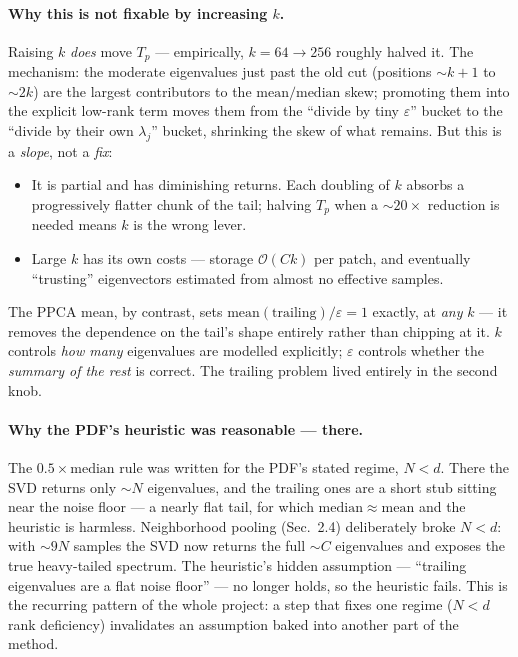 \documentclass[11pt]{article}
\begin{document}
\paragraph{Why this is not fixable by increasing $k$.}
Raising $k$ \emph{does} move $T_p$ --- empirically, $k = 64 \to 256$ roughly
halved it. The mechanism: the moderate eigenvalues just past the old cut
(positions ${\sim}k\!+\!1$ to ${\sim}2k$) are the largest contributors to the
$\mathrm{mean}/\mathrm{median}$ skew; promoting them into the explicit
low-rank term moves them from the ``divide by tiny $\varepsilon$'' bucket to the
``divide by their own $\lambda_j$'' bucket, shrinking the skew of what remains.
But this is a \emph{slope}, not a \emph{fix}:
\begin{itemize}[noitemsep]
  \item It is partial and has diminishing returns. Each doubling of $k$ absorbs a
    progressively flatter chunk of the tail; halving $T_p$ when a ${\sim}20\times$
    reduction is needed means $k$ is the wrong lever.
  \item Large $k$ has its own costs --- storage $\mathcal{O}(Ck)$ per patch, and
    eventually ``trusting'' eigenvectors estimated from almost no effective
    samples.
\end{itemize}
The PPCA mean, by contrast, sets $\mathrm{mean}(\text{trailing})/\varepsilon = 1$
exactly, at \emph{any} $k$ --- it removes the dependence on the tail's shape
entirely rather than chipping at it. $k$ controls \emph{how many} eigenvalues are
modelled explicitly; $\varepsilon$ controls whether the \emph{summary of the rest}
is correct. The trailing problem lived entirely in the second knob.

\paragraph{Why the PDF's heuristic was reasonable --- there.}
The $0.5 \times \mathrm{median}$ rule was written for the PDF's stated regime,
$N < d$. There the SVD returns only ${\sim}N$ eigenvalues, and the trailing ones
are a short stub sitting near the noise floor --- a nearly flat tail, for which
$\mathrm{median} \approx \mathrm{mean}$ and the heuristic is harmless.
Neighborhood pooling (Sec.~2.4) deliberately broke $N < d$: with ${\sim}9N$
samples the SVD now returns the full ${\sim}C$ eigenvalues and exposes the true
heavy-tailed spectrum. The heuristic's hidden assumption --- ``trailing
eigenvalues are a flat noise floor'' --- no longer holds, so the heuristic fails.
This is the recurring pattern of the whole project: a step that fixes one regime
($N < d$ rank deficiency) invalidates an assumption baked into another part of the
method.
\end{document}
